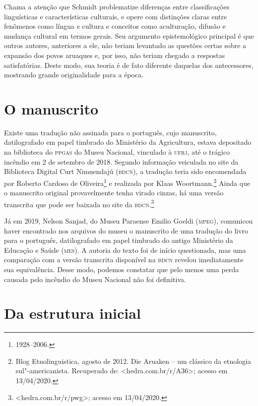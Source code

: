 Chama a atenção que Schmidt problematize diferenças entre classificações
linguísticas e características culturais, e opere com distinções claras
entre fenômenos como língua e cultura e conceitos como aculturação,
difusão e mudança cultural em termos gerais. Seu argumento
epistemológico principal é que outros autores, anteriores a ele, não
teriam levantado as questões certas sobre a expansão dos povos aruaques e, por
isso, não teriam chegado a respostas satisfatórias. Deste modo, sua teoria é de fato 
diferente daquelas dos antecessores, mostrando grande
originalidade para a época.

\section{O manuscrito}

Existe uma tradução não assinada para o português, cujo manuscrito, datilografado em papel timbrado do Ministério da Agricultura, estava depositado na biblioteca do \textsc{ppgas} do Museu Nacional, vinculado à \textsc{ufrj}, até o trágico incêndio em 2 de setembro de 2018. Segundo informação veiculada no site da Biblioteca Digital Curt Nimuendajú (\textsc{bdcn}), a tradução teria sido encomendada por Roberto Cardoso de Oliveira\footnote{1928--2006.} e realizada por Klaas Woortmann.\footnote{Blog Etnolinguistica, agosto de 2012. Die Aruaken -- um clássico da etnologia sul"-americanista. Recuperado de: \textless{}hedra.com.br/r/A36\textgreater{}; acesso em 13/04/2020.} Ainda que o manuscrito original provavelmente tenha virado cinzas, há uma versão transcrita que pode ser baixada no site da \textsc{bdcn}.\footnote{\textless{}hedra.com.br/r/pwg\textgreater{}; acesso em 13/04/2020.} 

Já em 2019, Nelson Sanjad, do Museu Paraense Emilio Goeldi (\textsc{mpeg}), comunicou haver encontrado nos arquivos do museu o manuscrito de uma tradução do livro para o português, datilografado em papel timbrado do antigo Ministério da Educação e Saúde (\textsc{mes}). A autoria do texto foi de início questionada, mas uma comparação com a versão transcrita disponível na \textsc{bdcn} revelou imediatamente sua equivalência. Desse modo, podemos constatar que pelo menos uma perda causada pelo incêndio do Museu Nacional não foi definitiva.

\section{Da estrutura inicial}

